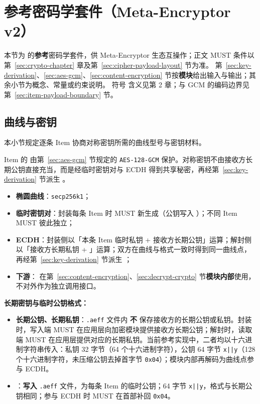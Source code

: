 \section{参考密码学套件（Meta-Encryptor v2）}\label{app:crypto-suite-v2}
本节为  的\textbf{参考}密码学套件，供 Meta-Encryptor 生态互操作；正文 MUST 条件以第~\ref{sec:crypto-chapter} 章及第~\ref{sec:cipher-payload-layout} 节为准。
第~\ref{sec:key-derivation}、\ref{sec:aes-gcm}、\ref{sec:content-encryption} 节按\textbf{模块}给出输入与输出；其余小节为概念、常量或约束说明。
符号  含义见第 2 章；与 GCM 的编码边界见第~\ref{sec:item-payload-boundary} 节。

\subsection{曲线与密钥}\label{sec:curve-keys}
本小节规定逐条 Item 协商对称密钥所需的曲线型号与密钥材料。

Item 的  由第~\ref{sec:aes-gcm} 节规定的 \texttt{AES-128-GCM}
保护。对称密钥不由接收方长期公钥直接充当，而是经临时密钥对与 ECDH 得到共享秘密，再经第~\ref{sec:key-derivation} 节派生
。

\begin{itemize}
  \item \textbf{椭圆曲线}：\texttt{secp256k1}；
  \item \textbf{临时密钥对}：封装每条 Item 时 MUST 新生成（公钥写入 ）；不同 Item MUST 彼此独立；
  \item \textbf{ECDH}：封装侧以「本条 Item 临时私钥 + 接收方长期公钥」运算；解封侧以「接收方长期私钥 + 」运算；双方在曲线与格式一致时得到同一曲线点，再经第~\ref{sec:key-derivation} 节派生 ；
  \item \textbf{下游}： 在第~\ref{sec:content-encryption}、\ref{sec:decrypt-crypto} 节\textbf{模块内部}使用，不对外作为独立调用接口。
\end{itemize}

\textbf{长期密钥与临时公钥格式：}
\begin{itemize}
  \item \textbf{长期公钥、长期私钥}：\texttt{.aeff} 文件内 \textbf{不} 保存接收方的长期公钥或私钥。封装时，写入端 MUST 在应用层向加密模块提供接收方长期公钥；解封时，读取端 MUST 在应用层提供对应的长期私钥。当前参考实现中，二者均以十六进制字符串传入：私钥 32 字节（64 个十六进制字符），公钥 64 字节 \texttt{x||y}（128 个十六进制字符，未压缩公钥去掉首字节 \texttt{0x04}）；模块内部再解码为曲线点参与 ECDH。
  \item {}：\textbf{写入} \texttt{.aeff} 文件，为每条 Item 的临时公钥；64 字节 \texttt{x||y}，格式与长期公钥相同；参与 ECDH 时 MUST 在首部补回 \texttt{0x04}。
\end{itemize}

